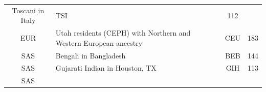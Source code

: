 \documentclass[]{book}
\theoremstyle{definition}
\theoremstyle{definition}
\theoremstyle{definition}
\theoremstyle{remark}
\begin{document}
\begin{longtable}[]{@{}clcc@{}}
\begin{minipage}[t]{0.59\columnwidth}
Toscani in Italy\strut
\end{minipage} & \begin{minipage}[t]{0.09\columnwidth}\centering\strut
TSI\strut
\end{minipage} & \begin{minipage}[t]{0.07\columnwidth}\centering\strut
112\strut
\end{minipage}\tabularnewline
\begin{minipage}[t]{0.14\columnwidth}\centering\strut
EUR\strut
\end{minipage} & \begin{minipage}[t]{0.59\columnwidth}\raggedright\strut
Utah residents (CEPH) with Northern and Western European ancestry\strut
\end{minipage} & \begin{minipage}[t]{0.09\columnwidth}\centering\strut
CEU\strut
\end{minipage} & \begin{minipage}[t]{0.07\columnwidth}\centering\strut
183\strut
\end{minipage}\tabularnewline
\begin{minipage}[t]{0.14\columnwidth}\centering\strut
SAS\strut
\end{minipage} & \begin{minipage}[t]{0.59\columnwidth}\raggedright\strut
Bengali in Bangladesh\strut
\end{minipage} & \begin{minipage}[t]{0.09\columnwidth}\centering\strut
BEB\strut
\end{minipage} & \begin{minipage}[t]{0.07\columnwidth}\centering\strut
144\strut
\end{minipage}\tabularnewline
\begin{minipage}[t]{0.14\columnwidth}\centering\strut
SAS\strut
\end{minipage} & \begin{minipage}[t]{0.59\columnwidth}\raggedright\strut
Gujarati Indian in Houston, TX\strut
\end{minipage} & \begin{minipage}[t]{0.09\columnwidth}\centering\strut
GIH\strut
\end{minipage} & \begin{minipage}[t]{0.07\columnwidth}\centering\strut
113\strut
\end{minipage}\tabularnewline
\begin{minipage}[t]{0.14\columnwidth}\centering\strut
SAS\strut

\end{minipage}
\end{longtable}
\end{document}
